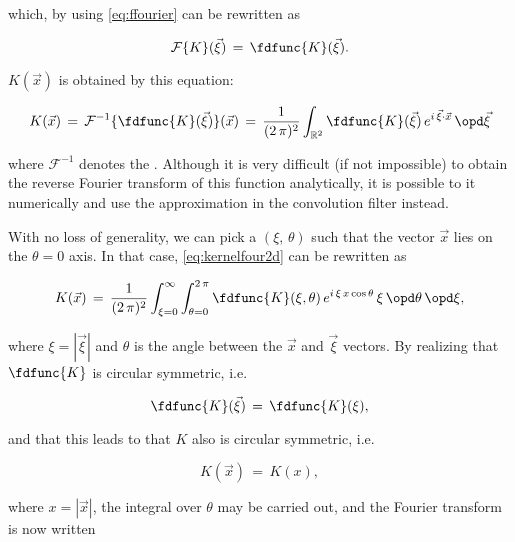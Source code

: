 which, by using \eqref{eq:ffourier} can be rewritten as

\begin{equation}
\mathcal{F}\{K\}(\vec{\xi}) \,=\, \fdfunc{K}(\vec{\xi}).
\end{equation}

$K(\vec{x})$ is obtained by  this equation:

\begin{equation} \label{eq:kernelfour2d}
K(\vec{x}) \,=\, \mathcal{F}^{-1}\{\fdfunc{K}(\vec{\xi})\}(\vec{x}) \,=\, \frac{1}{(2\,\pi)^2}\int_{\mathbb{R}^2}\fdfunc{K}(\vec{\xi})\,e^{i\,\vec{\xi}\cdot\vec{x}}\,\opd\vec{\xi}
\end{equation}

where $\mathcal{F}^{-1}$ denotes the . Although it is very difficult (if not impossible) to obtain the reverse Fourier transform of this function analytically, it is possible to  it numerically and use the approximation in the convolution filter instead.

With no loss of generality, we can pick a  $(\xi,\,\theta)$ such that the vector $\vec{x}$ lies on the $\theta = 0$ axis. In that case, \eqref{eq:kernelfour2d} can be rewritten as

\begin{equation}
K(\vec{x}) \,=\, \frac{1}{(2\,\pi)^2}\int_{\xi=0}^\infty\int_{\theta=0}^{2\,\pi}\fdfunc{K}(\xi, \theta)\,e^{i\,\xi\,x\cos\theta}\,\xi\,\opd\theta\,\opd\xi,
\end{equation}

where $\xi = |\vec{\xi}|$ and $\theta$ is the angle between the $\vec{x}$ and $\vec{\xi}$ vectors. By realizing that $\fdfunc{K}$ is circular symmetric, i.e.

\begin{equation}
\fdfunc{K}(\vec{\xi}) \,=\, \fdfunc{K}(\xi),
\end{equation}

and that this leads to that $K$ also is circular symmetric, i.e.

\begin{equation}
K(\vec{x}) \,=\, K(x),
\end{equation}

where $x = |\vec{x}|$, the integral over $\theta$ may be carried out, and the Fourier transform is now written

